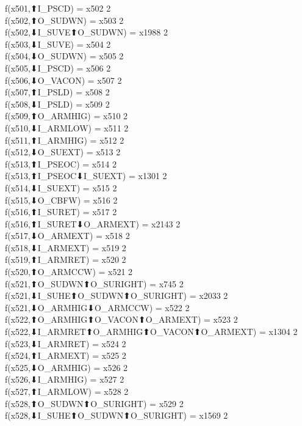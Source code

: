 f(x501,⬆I_PSCD) = x502 {2} \\
f(x502,⬆O_SUDWN) = x503 {2} \\
f(x502,⬇I_SUVE⬆O_SUDWN) = x1988 {2} \\
f(x503,⬇I_SUVE) = x504 {2} \\
f(x504,⬇O_SUDWN) = x505 {2} \\
f(x505,⬇I_PSCD) = x506 {2} \\
f(x506,⬇O_VACON) = x507 {2} \\
f(x507,⬆I_PSLD) = x508 {2} \\
f(x508,⬇I_PSLD) = x509 {2} \\
f(x509,⬆O_ARMHIG) = x510 {2} \\
f(x510,⬇I_ARMLOW) = x511 {2} \\
f(x511,⬆I_ARMHIG) = x512 {2} \\
f(x512,⬇O_SUEXT) = x513 {2} \\
f(x513,⬆I_PSEOC) = x514 {2} \\
f(x513,⬆I_PSEOC⬇I_SUEXT) = x1301 {2} \\
f(x514,⬇I_SUEXT) = x515 {2} \\
f(x515,⬇O_CBFW) = x516 {2} \\
f(x516,⬆I_SURET) = x517 {2} \\
f(x516,⬆I_SURET⬇O_ARMEXT) = x2143 {2} \\
f(x517,⬇O_ARMEXT) = x518 {2} \\
f(x518,⬇I_ARMEXT) = x519 {2} \\
f(x519,⬆I_ARMRET) = x520 {2} \\
f(x520,⬆O_ARMCCW) = x521 {2} \\
f(x521,⬆O_SUDWN⬆O_SURIGHT) = x745 {2} \\
f(x521,⬇I_SUHE⬆O_SUDWN⬆O_SURIGHT) = x2033 {2} \\
f(x521,⬇O_ARMHIG⬇O_ARMCCW) = x522 {2} \\
f(x522,⬆O_ARMHIG⬆O_VACON⬆O_ARMEXT) = x523 {2} \\
f(x522,⬇I_ARMRET⬆O_ARMHIG⬆O_VACON⬆O_ARMEXT) = x1304 {2} \\
f(x523,⬇I_ARMRET) = x524 {2} \\
f(x524,⬆I_ARMEXT) = x525 {2} \\
f(x525,⬇O_ARMHIG) = x526 {2} \\
f(x526,⬇I_ARMHIG) = x527 {2} \\
f(x527,⬆I_ARMLOW) = x528 {2} \\
f(x528,⬆O_SUDWN⬆O_SURIGHT) = x529 {2} \\
f(x528,⬇I_SUHE⬆O_SUDWN⬆O_SURIGHT) = x1569 {2} \\
